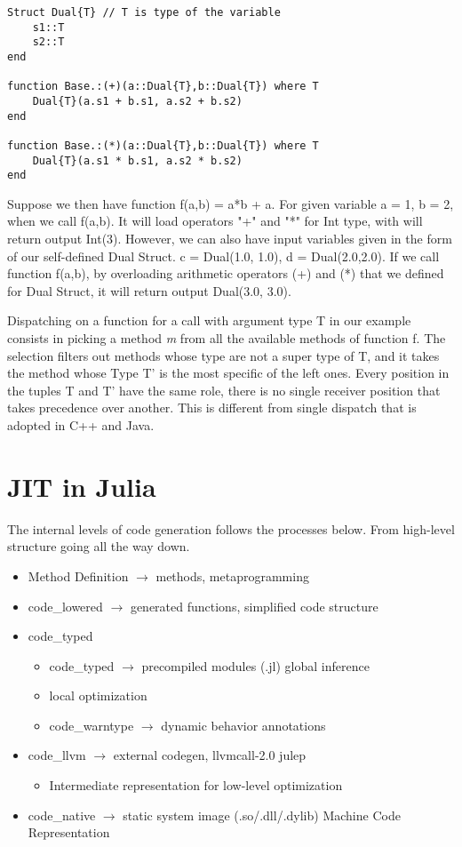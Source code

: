 \documentclass[11pt]{article}
\begin{document}
\begin{lstlisting}
Struct Dual{T} // T is type of the variable
    s1::T
    s2::T
end

function Base.:(+)(a::Dual{T},b::Dual{T}) where T
    Dual{T}(a.s1 + b.s1, a.s2 + b.s2)
end
 
function Base.:(*)(a::Dual{T},b::Dual{T}) where T
    Dual{T}(a.s1 * b.s1, a.s2 * b.s2)
end
\end{lstlisting}{}

Suppose we then have function f(a,b) = a*b + a. For given variable a = 1, b = 2, when we call f(a,b). It will load operators "+" and "*" for Int type, with will return output Int(3). However, we can also have input variables given in the form of our self-defined Dual Struct. c = Dual(1.0, 1.0), d = Dual(2.0,2.0). If we call function f(a,b), by overloading arithmetic operators (+) and (*) that we defined for Dual Struct, it will return output Dual(3.0, 3.0).

Dispatching on a function for a call with argument type T in our example consists in picking a method \textit{m} from all the available methods of function f. The selection filters out methods whose type are not a super type of T, and it takes the method whose Type T' is the most specific of the left ones. Every position in the tuples T and T' have the same role, there is no single receiver position that takes precedence over another. This is different from single dispatch that is adopted in C++ and Java.


\section{JIT in Julia}\label{sec:JIT}
The internal levels of code generation follows the processes below. From high-level structure going all the way down. 
\begin{itemize}
    \item Method Definition $\rightarrow$ methods, metaprogramming
    \item {code\_lowered $\rightarrow$ generated functions, simplified code structure}
    \item code\_typed \begin{itemize}
        \item {code\_typed} $\rightarrow$ precompiled modules (.jl) global inference
        \item local optimization
        \item code\_warntype $\rightarrow$ dynamic behavior annotations 
    \end{itemize}
    \item code\_llvm $\rightarrow$ external codegen, llvmcall-2.0 julep
    \begin{itemize}
        \item Intermediate representation for low-level optimization
    \end{itemize}
    \item {code\_native} $\rightarrow$ static system image (.so/.dll/.dylib) Machine Code Representation
\end{itemize}
\end{document}
